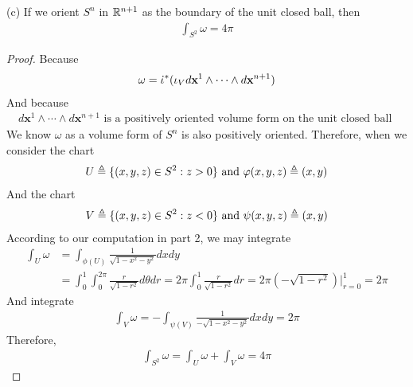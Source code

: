 \documentclass{report}
\begin{document}
\begin{theorem}
  (c) If we orient $S^n$ in  $\mathbb{R}^{n+1}$ as the boundary of the unit closed ball, then 
\begin{align*}
\int_{S^2}\omega =4\pi  
\end{align*}
\end{theorem}
\begin{proof}
Because 
\begin{align*} 
\omega = \dot{\iota}^*(\iota_V d\textbf{x}^1 \wedge  \cdots \wedge  d\textbf{x}^{n+1}   )   
\end{align*}
And because  
\begin{align*}
d\textbf{x}^1 \wedge  \cdots \wedge  d \textbf{x}^{n+1}   \text{ is a positively oriented volume form on the unit closed ball }
\end{align*}
We know $\omega$ as a volume form of $S^n$ is also positively oriented. Therefore, when we consider the chart  
\begin{align*}
U \triangleq \{ (x,y,z)\in S^2:z>0 \}\text{ and } \varphi(x,y,z)\triangleq (x,y)
\end{align*}
And the chart 
\begin{align*}
V\triangleq \{ (x,y,z)\in S^2 :z<0 \}\text{ and }\psi (x,y,z)\triangleq (x,y)
\end{align*}
According to our computation in part 2, we may integrate  
\begin{align*}
\int_U \omega&= \int_{\phi (U)} \frac{1}{\sqrt{1-x^2-y^2} }dxdy \\
&=\int_{0}^1 \int_{0}^{2\pi } \frac{r}{\sqrt{1-r^2} }d\theta dr=2\pi  \int_{0}^1 \frac{r}{\sqrt{1-r^2} }dr= 2\pi  (-\sqrt{1-r^2} )\Big|_{r=0}^1=2\pi 
\end{align*}
And integrate 
\begin{align*}
\int_V \omega= -\int_{\psi (V)} \frac{1}{-\sqrt{1-x^2-y^2} }dxdy= 2\pi 
\end{align*}
Therefore, 
\begin{align*}
\int_{S^2}\omega= \int_U \omega + \int_V \omega = 4\pi 
\end{align*}
\end{proof}
\end{document}
